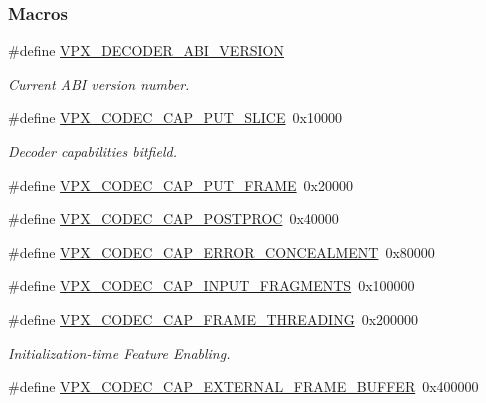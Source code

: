 \subsubsection*{Macros}
\begin{DoxyCompactItemize}
\item 
\#define \hyperlink{group__decoder_ga462b459e7ae13937e1eae1776245db12}{V\+P\+X\+\_\+\+D\+E\+C\+O\+D\+E\+R\+\_\+\+A\+B\+I\+\_\+\+V\+E\+R\+S\+I\+ON}\hypertarget{group__decoder_ga462b459e7ae13937e1eae1776245db12}{}\label{group__decoder_ga462b459e7ae13937e1eae1776245db12}

\begin{DoxyCompactList}\small\item\em Current A\+BI version number. \end{DoxyCompactList}\item 
\#define \hyperlink{group__decoder_ga9e33b8ee81025d5fc3d01b0975ad5f96}{V\+P\+X\+\_\+\+C\+O\+D\+E\+C\+\_\+\+C\+A\+P\+\_\+\+P\+U\+T\+\_\+\+S\+L\+I\+CE}~0x10000
\begin{DoxyCompactList}\small\item\em Decoder capabilities bitfield. \end{DoxyCompactList}\item 
\#define \hyperlink{group__decoder_ga0ef59ca8067ac1dc8c8378042277ccc8}{V\+P\+X\+\_\+\+C\+O\+D\+E\+C\+\_\+\+C\+A\+P\+\_\+\+P\+U\+T\+\_\+\+F\+R\+A\+ME}~0x20000
\item 
\#define \hyperlink{group__decoder_ga7825ade982ab85a5583d3d8a669baa3b}{V\+P\+X\+\_\+\+C\+O\+D\+E\+C\+\_\+\+C\+A\+P\+\_\+\+P\+O\+S\+T\+P\+R\+OC}~0x40000
\item 
\#define \hyperlink{group__decoder_gac44cd9e4722e1eb32a37c3eaec8d97b9}{V\+P\+X\+\_\+\+C\+O\+D\+E\+C\+\_\+\+C\+A\+P\+\_\+\+E\+R\+R\+O\+R\+\_\+\+C\+O\+N\+C\+E\+A\+L\+M\+E\+NT}~0x80000
\item 
\#define \hyperlink{group__decoder_gae89cbd3e8089803c6f4a67fc67a8c531}{V\+P\+X\+\_\+\+C\+O\+D\+E\+C\+\_\+\+C\+A\+P\+\_\+\+I\+N\+P\+U\+T\+\_\+\+F\+R\+A\+G\+M\+E\+N\+TS}~0x100000
\item 
\#define \hyperlink{group__decoder_gaee3981006b67dfdccad895cbef7936e6}{V\+P\+X\+\_\+\+C\+O\+D\+E\+C\+\_\+\+C\+A\+P\+\_\+\+F\+R\+A\+M\+E\+\_\+\+T\+H\+R\+E\+A\+D\+I\+NG}~0x200000
\begin{DoxyCompactList}\small\item\em Initialization-\/time Feature Enabling. \end{DoxyCompactList}\item 
\#define \hyperlink{group__decoder_ga32c2ab619fbb5c575546cc0b623a1a09}{V\+P\+X\+\_\+\+C\+O\+D\+E\+C\+\_\+\+C\+A\+P\+\_\+\+E\+X\+T\+E\+R\+N\+A\+L\+\_\+\+F\+R\+A\+M\+E\+\_\+\+B\+U\+F\+F\+ER}~0x400000

\end{DoxyCompactItemize}
